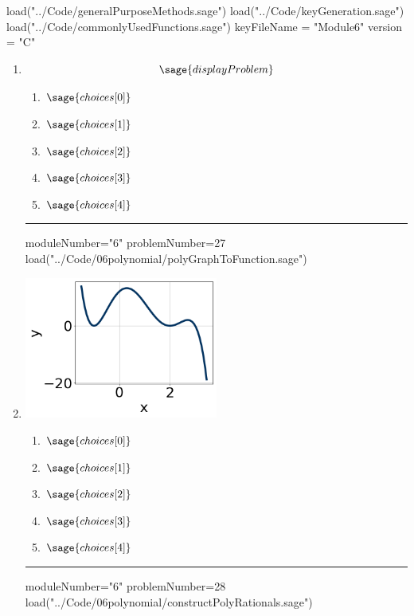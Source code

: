 \documentclass[14pt]{extbook}
\newcommand{\litem}[1]{\item#1\hspace*{-1cm}\rule{\textwidth}{0.4pt}}
\begin{document}
\pagestyle{fancy}

\begin{sagesilent}
load("../Code/generalPurposeMethods.sage")
load("../Code/keyGeneration.sage")
load("../Code/commonlyUsedFunctions.sage")
keyFileName = "Module6"
version = "C"
\end{sagesilent}

\begin{enumerate}

\begin{sagesilent}
moduleNumber="6"
problemNumber=26
load("../Code/06polynomial/constructPolyComplex.sage")
\end{sagesilent}

\litem{ 

   \[ \sage{displayProblem} \]

  	\begin{enumerate}[label=\Alph*.]
    \item \( \sage{choices[0]} \)
    \item \( \sage{choices[1]} \)
    \item \( \sage{choices[2]} \)
    \item \( \sage{choices[3]} \)
    \item \( \sage{choices[4]} \)
  	\end{enumerate}
  }

  \begin{sagesilent}
  moduleNumber="6"
  problemNumber=27
  load("../Code/06polynomial/polyGraphToFunction.sage")
  \end{sagesilent}

  \litem{ 

   \begin{center}
       \includegraphics[width=0.5\textwidth]{../Figures/polyGraphToFunctionC.png}
   \end{center}

  	\begin{enumerate}[label=\Alph*.]
    \item \( \sage{choices[0]} \)
    \item \( \sage{choices[1]} \)
    \item \( \sage{choices[2]} \)
    \item \( \sage{choices[3]} \)
    \item \( \sage{choices[4]} \)
  	\end{enumerate}
  }
\begin{sagesilent}
moduleNumber="6"
problemNumber=28
load("../Code/06polynomial/constructPolyRationals.sage")
\end{sagesilent}


\end{enumerate}
\end{document}
